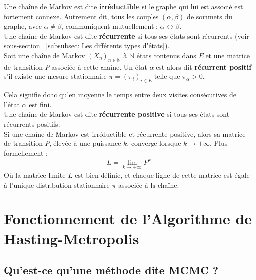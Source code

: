 \documentclass{article}
\begin{document}
\begin{tcolorbox}[colback=white,colframe=yellow!80!black,title=Backup (à supprimer)]
Une chaîne de Markov est dite \textbf{irréductible} si le graphe qui lui est associé est fortement connexe. %
Autrement dit, tous les couples $(\alpha, \beta)$ de sommets du graphe, avec $\alpha \neq \beta$, communiquent mutuellement ; $\alpha \leftrightarrow \beta$. \\

Une chaîne de Markov est dite \textbf{récurrente} si tous ses états sont récurrents (voir sous-section ~\ref{subsubsec: Les différents types d'états}). \\ %

Soit une chaîne de Markov $(X_n)_{n \in \mathbb{N}}$ à $\mathbb{N}$ états contenus dans $E$ et une matrice de transition $P$ associée à cette chaîne. Un état $\alpha$ est alors dit \textbf{récurrent positif} s'il existe une mesure stationnaire $\pi = (\pi_i)_{i \in E}$ telle que $\pi_\alpha > 0$.

Cela signifie donc qu'en moyenne le temps entre deux visites consécutives de l'état $\alpha$ est fini. \\

Une chaîne de Markov est dite \textbf{récurrente positive} si tous ses états sont récurrents positifs. \\

Si une chaîne de Markov est irréductible et récurrente positive, alors sa matrice de transition $P$, élevée à une puissance $k$, converge lorsque $k \to +\infty$. Plus formellement :
\[
L = \lim_{k \to +\infty} P^k
\]
Où la matrice limite $L$ est bien définie, et chaque ligne de cette matrice est égale à l'unique distribution stationnaire $\pi$ associée à la chaîne.
\end{tcolorbox}

\newpage
\section{Fonctionnement de l'Algorithme de Hasting-Metropolis}

\subsection{Qu'est-ce qu'une méthode dite MCMC ?}
\end{document}
